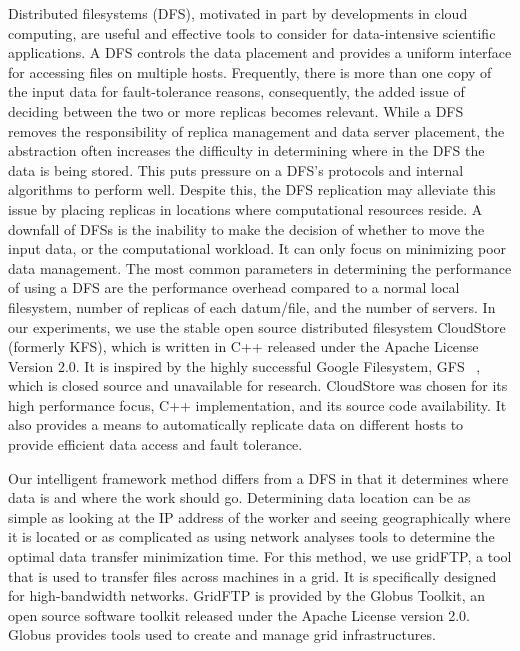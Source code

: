 \documentclass{rspublic}
\begin{document}
Distributed filesystems (DFS), motivated in part by
developments in cloud computing, are useful and effective tools to consider for
data-intensive scientific applications. A DFS controls the data placement and provides
a uniform interface for accessing files on multiple hosts.
Frequently, there is more than
one copy of the input data for fault-tolerance reasons, consequently, the added
issue of deciding between the two or more replicas becomes relevant.
While a DFS removes the responsibility of replica management and data
server placement, the abstraction often increases the difficulty in
determining where in the DFS the data is being stored.  This
puts pressure on a DFS's protocols and internal algorithms to perform
well.  Despite this, the DFS replication may alleviate this issue by
placing replicas in locations where computational resources reside. 
A downfall of DFSs is the inability to make the decision of whether to move
the input data, or the computational workload.  It can only
focus on minimizing poor data management. The most common parameters
in determining the performance of using a DFS are the performance
overhead compared to a normal local filesystem, number of replicas of
each datum/file, and the number of servers. In our experiments, 
we use the stable open source
distributed filesystem CloudStore (formerly KFS), which is written in
C++ released under the Apache License Version 2.0.  It is inspired by
the highly successful Google Filesystem, GFS ~\citep{cloudstore_web}, 
which is closed source and
unavailable for research.  CloudStore was chosen for its
 high performance focus, C++
implementation, and its source code availability. It
also provides a means to automatically replicate data on 
different hosts to provide
efficient data access and fault tolerance.  

Our intelligent framework method differs from a DFS in that it
determines where data is and where the work should go. 
Determining data location can be as simple as
looking at the IP address of the worker and seeing geographically where
it is located or as complicated as using network analyses tools to
determine the optimal data transfer minimization time. 
For this method, we use gridFTP, a tool that is used to transfer
files across machines in a grid.  It is
specifically designed for high-bandwidth networks. GridFTP  is provided by
the Globus Toolkit, an open source software toolkit
released under the Apache License version 2.0.  Globus provides tools used
to create and manage grid infrastructures. 
\end{document}
